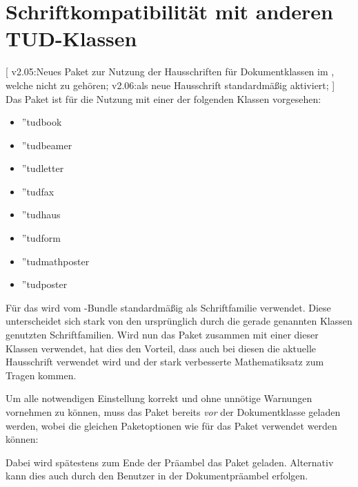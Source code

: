 \section[%
  Das Paket \Package{fix-tudscrfonts} -- Schriftkompatibilität%
]{%
  Schriftkompatibilität mit anderen TUD-Klassen%
}
%
\begin{DeclareEntity}{}[%
  v2.05:Neues Paket zur Nutzung der Hausschriften für Dokumentklassen im 
  \TUDCD, welche nicht zu \TUDScript gehören;%
  v2.06:\OpenSans als neue Hausschrift standardmäßig aktiviert;%
]
%
Das Paket  ist für die Nutzung mit einer der folgenden 
Klassen vorgesehen:
\begin{itemize}
\item \Class''{tudbook}
\item \Class''{tudbeamer}
\item \Class''{tudletter}
\item \Class''{tudfax}
\item \Class''{tudhaus}
\item \Class''{tudform}
\item \Class''{tudmathposter}
\item \Class''{tudposter}
\end{itemize}
%
Für das \TUDCD wird vom \TUDScript-Bundle standardmäßig \OpenSans als 
Schriftfamilie verwendet. Diese unterscheidet sich stark von den ursprünglich 
durch die gerade genannten Klassen genutzten Schriftfamilien. Wird nun das 
Paket  zusammen mit einer dieser Klassen verwendet, 
hat dies den Vorteil, dass auch bei diesen die aktuelle Hausschrift verwendet 
wird und der stark verbesserte Mathematiksatz zum Tragen kommen.
%

Um alle notwendigen Einstellung korrekt und ohne unnötige Warnungen vornehmen 
zu können, muss das Paket  bereits \emph{vor} der 
Dokumentklasse geladen werden, wobei die gleichen Paketoptionen wie für das 
Paket  verwendet werden können:
%
\begin{quoting}[rightmargin=0pt]
\end{quoting}
%
Dabei wird spätestens zum Ende der Präambel das Paket  
geladen. Alternativ kann dies auch durch den Benutzer in der Dokumentpräambel 
erfolgen.
\end{DeclareEntity}
